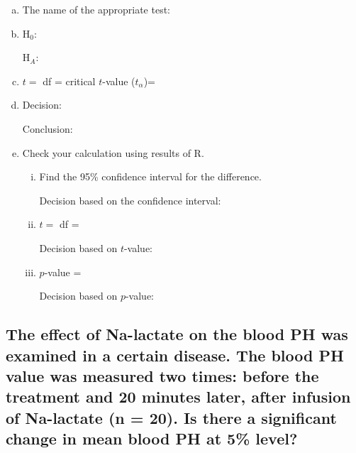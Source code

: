 \begin{enumerate}[a)]
\item The name of the appropriate test: \hrulefill
\item H$_0$:	 \hrulefill


	 H$_A$:	 \hrulefill
\item $t =$ 	 \hrulefill\quad  df = \hrulefill \quad critical $t$-value ($t_\alpha$)= \hrulefill
\item Decision: 	 \hrulefill

	Conclusion: \hrulefill


\item Check your calculation using results of R.





	\begin{enumerate}[i)]
	\item Find the 95\% confidence interval for the difference. 	 \hrulefill
	
	
		Decision based on the confidence interval: 		\hrulefill
	\item $t =$ 	 \hrulefill\quad df = 	\hrulefill	
	
		 Decision based on $t$-value: 	\hrulefill
	\item $p$-value = \hrulefill 
	
		Decision based on $p$-value: 	\hrulefill
	\end{enumerate}
\end{enumerate}


\subsection{The effect of Na-lactate on the blood PH was examined in a certain disease. The blood PH value was measured two times: before the treatment and 20 minutes later, after infusion of Na-lactate (n = 20). Is there a significant change in mean blood PH at 5\% level?}

